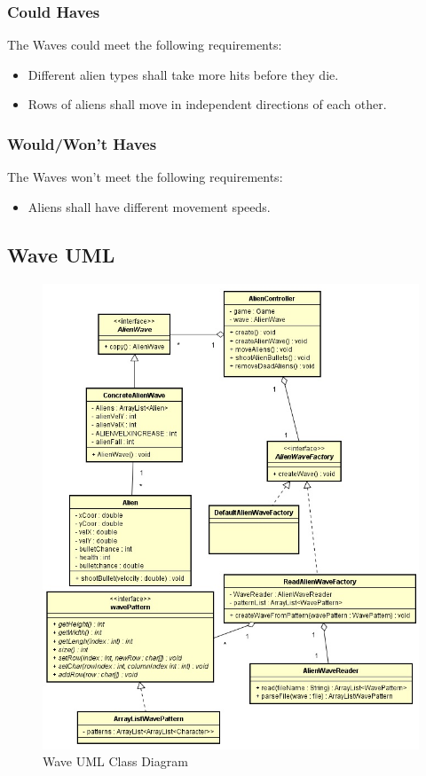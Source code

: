 \subsubsection{Could Haves}
The Waves could meet the following requirements:
\begin{itemize}
	\item Different alien types shall take more hits before they die.
	\item Rows of aliens shall move in independent directions of each other.
\end{itemize}
\subsubsection{Would/Won't Haves}
The Waves won't meet the following requirements:
\begin{itemize}
	\item Aliens shall have different movement speeds.
\end{itemize}
\newpage
\subsection{Wave UML}
\begin{figure}[ht!]
\centering
\includegraphics[width=14cm]{waveUML.jpg}
\caption{Wave UML Class Diagram}
\end{figure}

